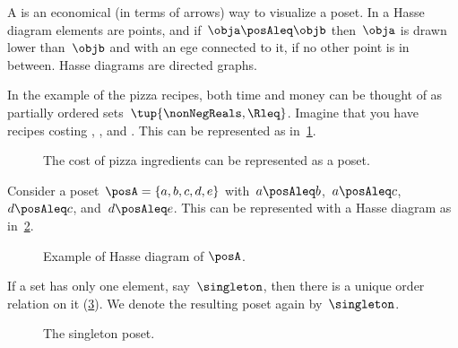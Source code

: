 A \emph{} is an economical (in terms of arrows) way to visualize a poset. In a Hasse diagram elements are points, and if~$\obja \posAleq \objb$ then~$\obja$ is drawn lower than~$\objb$ and with an ege connected to it, if no other point is in between. Hasse diagrams are directed graphs.

In the example of the pizza recipes, both time and money can be thought of as partially ordered sets~$\tup{\nonNegReals,\Rleq}$. Imagine that you have recipes costing \unit[1]{\stdcurr}, \unit[2]{\stdcurr}, and \unit[3]{\stdcurr}. This can be represented as in~\cref{fig:hassepizza}.

\begin{figure}[h!]
  \begin{center}
    \caption{The cost of pizza ingredients can be represented as a poset.}
    \label{fig:hassepizza}
  \end{center}
\end{figure}


\begin{example}
  Consider a poset~$\posA=\{a,b,c,d,e\}$ with~$a\posAleq b$,~$a\posAleq c$,~$d\posAleq c$, and~$d\posAleq e$. This can be represented with a Hasse diagram as in~\cref{fig:hasse}.
\end{example}

\begin{figure}[h!]
  \centering
  \caption{Example of Hasse diagram of $\posA$. \label{fig:hasse}}
\end{figure}

\begin{example}
  \label{ex:singleton}
  If a set has only one element, say~$\singleton$, then there is a unique order relation on it (\cref{fig:singleton}). We denote the resulting poset again by~$\singleton$.
\end{example}
\begin{figure}[h!]
  \centering
  \caption{The singleton poset.\label{fig:singleton}}
\end{figure}

